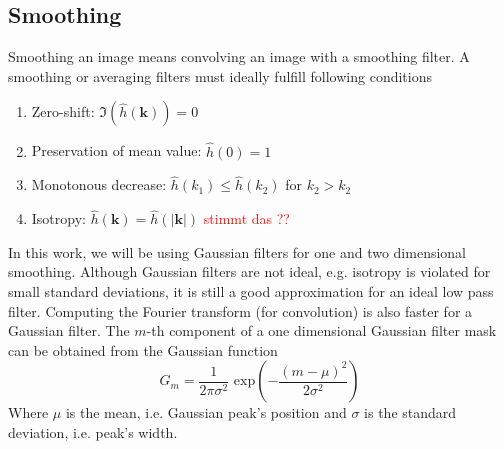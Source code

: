 		\subsection{Smoothing}
		Smoothing an image means convolving an image with a smoothing filter. A smoothing or averaging filters must ideally fulfill following conditions
		\begin{enumerate}
			\item Zero-shift: $\Im (\hat{h}(\mathbf{k})) = 0$
			\item Preservation of mean value: $\hat{h}(0) = 1 $
			\item Monotonous decrease: $ \hat{h}(k_1) \leq \hat{h}(k_2) $ for $ k_2 > k_2 $
			\item Isotropy: $\hat{h}(\mathbf{k}) = \hat{h}(| \mathbf{k} |)$ \textcolor{red}{stimmt das ??}
		\end{enumerate}
		
		In this work, we will be using Gaussian filters for one and two dimensional smoothing. Although Gaussian filters are not ideal, e.g. isotropy is violated for small standard deviations, it is still a good approximation for an ideal low pass filter. Computing the Fourier transform (for convolution) is also faster for a Gaussian filter. The $m$-th component of a one dimensional Gaussian filter mask can be obtained from the Gaussian function
		\begin{equation}
		G_{m} = \dfrac{1}{2 \pi \sigma^2} \text{ exp}
			 \left( 
			 	- \dfrac{(m-\mu)^2}{2 \sigma^2}
			 \right)
		\end{equation}
		Where $\mu$ is the mean, i.e. Gaussian peak's position and $\sigma$ is the standard deviation, i.e. peak's width.
		
